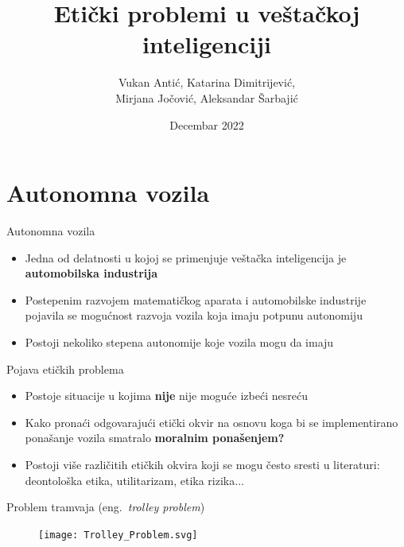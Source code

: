 \documentclass[14pt, aspectratio=169]{beamer}
\title{Etički problemi u veštačkoj inteligenciji}
\author{Vukan Antić, Katarina Dimitrijević, \\ Mirjana Jočović, Aleksandar Šarbajić}
\date{Decembar 2022}
\begin{document}
\maketitle

\section{Autonomna vozila}

\begin{frame}{Autonomna vozila}
    \begin{itemize}
        \item Jedna od delatnosti u kojoj se primenjuje veštačka inteligencija je \textbf{automobilska industrija}
    \end{itemize}
    \begin{itemize}
        \item Postepenim razvojem matematičkog aparata i automobilske industrije pojavila se mogućnost razvoja vozila koja imaju potpunu autonomiju
    \end{itemize}
    \begin{itemize}
        \item Postoji nekoliko stepena autonomije koje vozila mogu da imaju
    \end{itemize}
\end{frame}

\begin{frame}{Pojava etičkih problema}
    \begin{itemize}
        \item <1-> Postoje situacije u kojima \textbf{nije} nije moguće izbeći nesreću
    \end{itemize}
    \begin{itemize}
        \item <2-> Kako pronaći odgovarajući etički okvir na osnovu koga bi se implementirano ponašanje vozila smatralo \textbf{moralnim ponašenjem? }
    \end{itemize}
    \begin{itemize}
        \item <3-> Postoji više različitih etičkih okvira koji se mogu često sresti u literaturi: deontološka etika, utilitarizam, etika rizika...
    \end{itemize}
\end{frame}

\begin{frame}{Problem tramvaja (eng.~{\em trolley problem})}
   \begin{figure}[h!]
        \begin{center}
            \texttt{[image: Trolley\_Problem.svg]}
        \end{center}
        \label{fig:minAI}
    \end{figure}
\end{frame}
\end{document}
